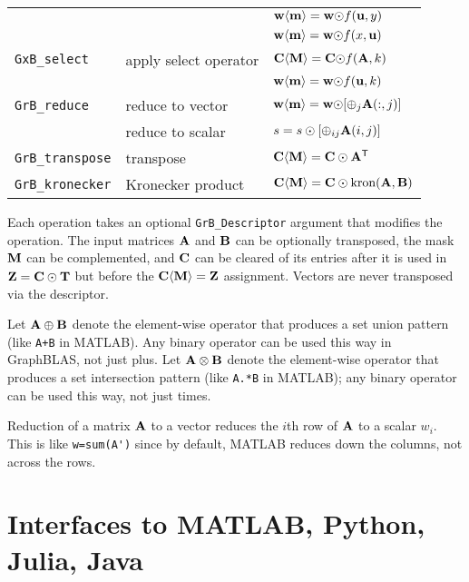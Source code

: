 \documentclass[12pt]{article}
\begin{document}
{\begin{tabular}{lll}
                     &                         & ${\bf w \langle m \rangle = w \odot} f({\bf u},y)$ \\
                     &                         & ${\bf w \langle m \rangle = w \odot} f(x,{\bf u})$ \\
\hline
\verb'GxB_select'    & apply select operator   & ${\bf C \langle M \rangle = C \odot} f({\bf A},k)$ \\
                     &                         & ${\bf w \langle m \rangle = w \odot} f({\bf u},k)$ \\
\hline
\verb'GrB_reduce'    & reduce to vector        & ${\bf w \langle m \rangle = w \odot} [{\oplus}_j {\bf A}(:,j)]$ \\
                     & reduce to scalar        & $s = s \odot [{\oplus}_{ij}  {\bf A}(i,j)]$ \\
\hline
\verb'GrB_transpose' & transpose               & ${\bf C \langle M \rangle = C \odot A^{\sf T}}$ \\
\hline
\verb'GrB_kronecker' & Kronecker product       & ${\bf C \langle M \rangle = C \odot \mbox{kron}(A, B)}$ \\
\hline
\end{tabular}
}
\vspace{0.15in}

Each operation takes an optional \verb'GrB_Descriptor' argument that modifies
the operation.  The input matrices ${\bf A}$ and ${\bf B}$ can be optionally
transposed, the mask ${\bf M}$ can be complemented, and ${\bf C}$ can be
cleared of its entries after it is used in ${\bf Z = C \odot T}$ but before
the ${\bf C \langle M \rangle = Z}$ assignment.
Vectors are never transposed via the descriptor.

Let ${\bf A \oplus B}$ denote the element-wise operator that produces a set
union pattern (like \verb'A+B' in MATLAB).  Any binary operator can be used
this way in GraphBLAS, not just plus.  Let ${\bf A \otimes B}$ denote the
element-wise operator that produces a set intersection pattern (like
\verb'A.*B' in MATLAB); any binary operator can be used this way, not just
times.

Reduction of a matrix ${\bf A}$ to a vector reduces the $i$th row of ${\bf A}$
to a scalar $w_i$.  This is like \verb"w=sum(A')" since by default, MATLAB
reduces down the columns, not across the rows.

\newpage
\section{Interfaces to MATLAB, Python, Julia, Java} %
\end{document}
